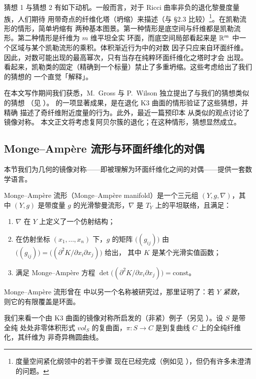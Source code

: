 猜想 1 与猜想 2 有如下动机。一般而言，对于 Ricci 曲率非负的退化黎曼度量族，人们期待
用带奇点的纤维化塔（坍缩）来描述（与 §2.3 比较）\footnote{度量空间紧化纲领中的若干步骤
现在已经完成（例如见 \cite{CC}），但仍有许多未澄清的问题。}。在凯勒流形的情形，简单坍缩有
两种基本图景。第一种情形是底空间与纤维都是凯勒流形。第二种情形是纤维为 $m$ 维平坦全实
环面，而底空间局部看起来是 $\mathbb{R}^m$ 中一个区域与某个凯勒流形的乘积。体积渐近行为中的对数
因子只应来自环面纤维。因此，对数可能出现的最高幂次，只有当存在纯粹环面纤维化之塔时才会
出现。看起来，凯勒类的固定（精确到一个标量）禁止了多重坍缩。这些考虑给出了我们的猜想的
一个直觉「解释」。

\begin{rmk}
在本文写作期间我们获悉，M.~Gross 与 P.~Wilson 独立提出了与我们的猜想类似的猜想
（见 \cite{GW}）。\cite{GW} 的一项显著成果，是在退化 K3 曲面的情形验证了这些猜想，并精确
描述了奇纤维附近度量的行为。此外，最近一篇预印本 \cite{Le} 从类似的观点讨论了镜像对称。
本文正文将考虑复阿贝尔簇的退化；在这种情形，猜想显然成立。
\end{rmk}

\subsection{Monge--Ampère 流形与环面纤维化的对偶}

本节我们为几何的镜像对称——即被理解为环面纤维化之间的对偶——提供一套数学语言。

\begin{dfn}
Monge--Ampère 流形（Monge--Ampère manifold）是一个三元组 $(Y,g,\nabla)$，其中 $(Y,g)$
是带度量 $g$ 的光滑黎曼流形，$\nabla$ 是 $T_Y$ 上的平坦联络，且满足：
\begin{enumerate}[label=\textup{\alph*}),leftmargin=2em,itemsep=2pt]
  \item $\nabla$ 在 $Y$ 上定义了一个仿射结构；
  \item 在仿射坐标 $(x_1,\dots,x_n)$ 下，$g$ 的矩阵 $\bigl((g_{ij})\bigr)$ 由
        $\bigl((g_{ij})\bigr)=\bigl((\partial^2K/\partial x_i\partial x_j)\bigr)$ 给出，
        其中 $K$ 是某个光滑实值函数；
  \item 满足 Monge--Ampère 方程
        $\det\bigl((\partial^2K/\partial x_i\partial x_j)\bigr)=\mathrm{const}$。
\end{enumerate}
\end{dfn}

Monge--Ampère 流形曾在 \cite{CY} 中以另一个名称被研究过，那里证明了：若 $Y$ \emph{紧致}，
则它的有限覆盖是环面。

我们来看一个由 K3 曲面的镜像对称所启发的（非紧）例子（另见 \cite{GW}）。设 $S$ 是带全纯
处处非零体积形式 $vol_S$ 的复曲面，$\pi:S\to C$ 是到复曲线 $C$ 上的全纯纤维化，其纤维为
非奇异椭圆曲线。

